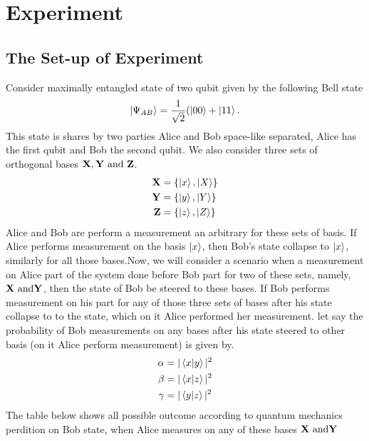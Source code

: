 \section{Experiment}\hfill \break
\subsection{The Set-up of Experiment}\hfill \break
Consider maximally entangled state of two qubit given by the following Bell state
\begin{align*}
\ket{\Psi_{AB}}=\frac{1}{\sqrt{2}}(\ket{00}+\ket{11}.
\end{align*}
This state is shares by two parties Alice and Bob space-like separated, Alice has the first qubit and Bob the second qubit.
We also consider  three sets of orthogonal bases $\bf{X}, \bf{Y} \text{ and } \bf{Z}$.
\begin{align}
 \bf{X}&=\{\ket{x},\ket{X}\}\\
 \bf{Y}&=\{\ket{y},\ket{Y}\}\\
  \bf{Z}&=\{\ket{z},\ket{Z}\}
\end{align}
Alice and Bob are perform a measurement an arbitrary for these sets of basis. If Alice  performs measurement on the basis $\ket{x}$, then Bob's state collapse to $\ket{x}$, similarly for all  those bases.Now, we will consider a scenario when a measurement on Alice part of the system  done before Bob part for two of these sets, namely, $\bf{X} \text{ and} \bf{Y} $, then the state of Bob be steered to these bases. If Bob performs measurement on his part for any of those three sets of bases after his state collapse to to the state, which on it Alice performed her measurement.
let say the probability of Bob measurements on any bases after his state steered to other basis (on it Alice perform measurement) is given by.
\begin{align*}
\alpha &=|\bra{x}\ket{y}|^2\\
\beta &=|\bra{x}\ket{z}|^2\\
\gamma& =|\bra{y}\ket{z}|^2
\end{align*}
The table below shows all possible outcome according to quantum mechanics perdition  on Bob state, when Alice measures on  any of these bases $\bf{X} \text{ and} \bf{Y} $



